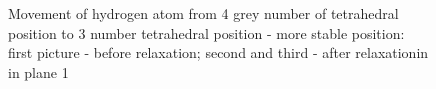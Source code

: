 \begin{figure}[h]
\begin{minipage}[h]{0.3\linewidth}
\end{minipage}
\hfill
\begin{minipage}[h]{0.3\linewidth}
\end{minipage}
\caption{Movement of hydrogen atom from 4 grey number of tetrahedral position to 3 number tetrahedral position - more stable position: first picture - before relaxation; second and third - after relaxationin in plane 1}
\label{4to3}
\end{figure}

